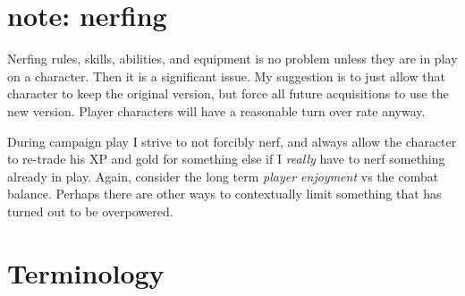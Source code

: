 \section*{note: nerfing}
Nerfing rules, skills, abilities, and equipment is no problem unless they are in play on a character. Then it is a significant issue. My suggestion is to just allow that character to keep the original version, but force all future acquisitions to use the new version. Player characters will have a reasonable turn over rate anyway.

During campaign play I strive to not forcibly nerf, and always allow the character to re-trade his XP and gold for something else if I \emph{really} have to nerf something already in play. Again, consider the long term \emph{player enjoyment} vs the combat balance. Perhaps there are other ways to contextually limit something that has turned out to be overpowered.












\section*{Terminology}

